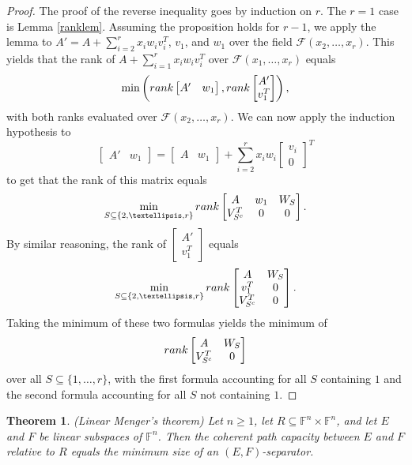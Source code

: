 \documentclass[10pt,a4paper]{amsart}
\newtheorem{thm}{Theorem}[section]
\begin{document}
\begin{proof}
The proof of the reverse inequality goes by induction on $r$. The $r = 1$ case is Lemma \ref{ranklem}. Assuming the proposition holds for $r - 1$, we apply the lemma to $A' = A + \sum_{i=2}^r x_iw_iv_i^T$, $v_1$, and $w_1$ over the field $\mathcal{F}(x_2, \ldots, x_r)$. This yields that the rank of $A + \sum_{i=1}^r x_iw_iv_i^T$ over $\mathcal{F}(x_1, \ldots, x_r)$ equals $$\min\left({\rm rank}\left[\begin{matrix}A'& w_1\end{matrix}\right], {\rm rank} \left[\begin{matrix}A'\\ v_1^T\end{matrix}\right]\right),$$ with both ranks evaluated over $\mathcal{F}(x_2, \ldots, x_r)$. We can now apply the induction hypothesis to $$\left[\begin{matrix}A'& w_1\end{matrix}\right] = \left[\begin{matrix}A&w_1\end{matrix}\right] + \sum_{i=2}^r x_iw_i\left[\begin{matrix}v_i\\0\end{matrix}\right]^T$$ to get that the rank of this matrix equals $$\min_{S \subseteq \{2, \ldots, r\}} {\rm rank}\left[\begin{matrix}A&w_1&W_S\\ V_{S^c}^T&0&0\end{matrix}\right].$$ By similar reasoning, the rank of $\left[\begin{matrix}A'\\ v_1^T\end{matrix}\right]$ equals $$\min_{S \subseteq \{2, \ldots, r\}} {\rm rank}\left[\begin{matrix}A&W_S\\v_1^T&0\\V_{S^c}^T&0\end{matrix}\right].$$ Taking the minimum of these two formulas yields the minimum of $${\rm rank} \left[\begin{matrix} A&W_S\\ V_{S^c}^T&0\end{matrix}\right]$$ over all $S \subseteq \{1, \ldots, r\}$, with the first formula accounting for all $S$ containing $1$ and the second formula accounting for all $S$ not containing $1$.
\end{proof}

\begin{thm}\label{qmt} (Linear Menger's theorem)
Let $n \geq 1$, let $R \subseteq \mathbb{F}^n\times \mathbb{F}^n$, and let $E$ and $F$ be linear subspaces of $\mathbb{F}^n$. Then the coherent path capacity between $E$ and $F$ relative to $R$ equals the minimum size of an $(E,F)$-separator.
\end{thm}
\end{document}
